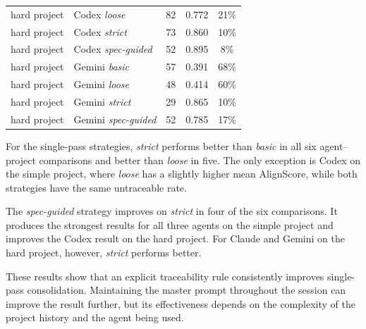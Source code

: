 \begin{longtable}{@{}llccc@{}}
  hard project & Codex \emph{loose}           & 82 & 0.772 & 21\% \\
  hard project & Codex \emph{strict}          & 73 & 0.860 & 10\% \\
  hard project & Codex \emph{spec-guided}     & 52 & 0.895 &  8\% \\
  hard project & Gemini \emph{basic}          & 57 & 0.391 & 68\% \\
  hard project & Gemini \emph{loose}          & 48 & 0.414 & 60\% \\
  hard project & Gemini \emph{strict}         & 29 & 0.865 & 10\% \\
  hard project & Gemini \emph{spec-guided}    & 52 & 0.785 & 17\% \\
\end{longtable}

For the single-pass strategies, \emph{strict} performs better than
\emph{basic} in all six agent--project comparisons and better than
\emph{loose} in five. The only exception is Codex on the simple project,
where \emph{loose} has a slightly higher mean AlignScore, while both
strategies have the same untraceable rate.

The \emph{spec-guided} strategy improves on \emph{strict} in four of the six
comparisons. It produces the strongest results for all three agents on the
simple project and improves the Codex result on the hard project. For Claude
and Gemini on the hard project, however, \emph{strict} performs better.

These results show that an explicit traceability rule consistently improves
single-pass consolidation. Maintaining the master prompt throughout the
session can improve the result further, but its effectiveness depends on the
complexity of the project history and the agent being used.
